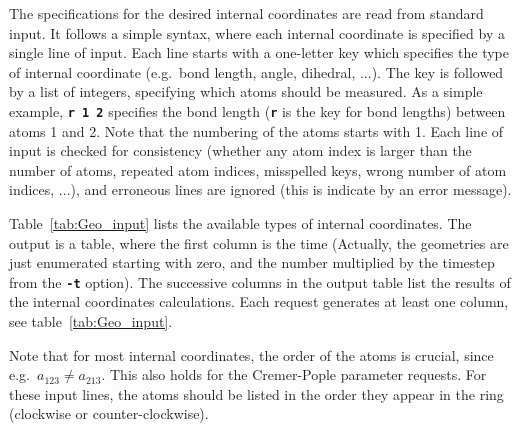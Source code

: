 \documentclass[a4paper,11pt,DIV=15,openany,twoside=false]{scrbook}
\newcommand{\ttt}[1]{\textbf{\texttt{#1}}}
\begin{document}
The specifications for the desired internal coordinates are read from standard input. It follows a simple syntax, where each internal coordinate is specified by a single line of input. Each line starts with a one-letter key which specifies the type of internal coordinate (e.g.\ bond length, angle, dihedral, ...). The key is followed by a list of integers, specifying which atoms should be measured. As a simple example, \ttt{r 1 2} specifies the bond length (\ttt{r} is the key for bond lengths) between atoms 1 and 2. Note that the numbering of the atoms starts with 1. Each line of input is checked for consistency (whether any atom index is larger than the number of atoms, repeated atom indices, misspelled keys, wrong number of atom indices, ...), and erroneous lines are ignored (this is indicate by an error message).

Table~\ref{tab:Geo_input} lists the available types of internal coordinates. The output is a table, where the first column is the time (Actually, the geometries are just enumerated starting with zero, and the number multiplied by the timestep from the \ttt{-t} option). The successive columns in the output table list the results of the internal coordinates calculations. Each request generates at least one column, see table~\ref{tab:Geo_input}. 

Note that for most internal coordinates, the order of the atoms is crucial, since e.g.\ $a_{123}\neq a_{213}$. This also holds for the Cremer-Pople parameter requests. For these input lines, the atoms should be listed in the order they appear in the ring (clockwise or counter-clockwise).
\end{document}
